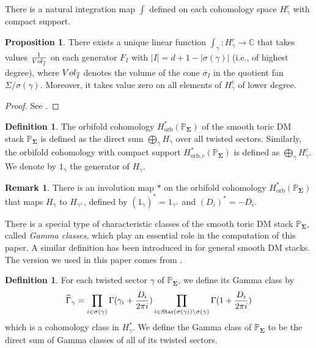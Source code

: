 \documentclass[11pt,reqno]{amsart}
\def\C {{\mathbb C}}
\def\PP {{\mathbb P}}
\def\Vol {{\rm Vol}}
\theoremstyle{definition}
\newtheorem{proposition}[theorem]{Proposition}
\newtheorem{definition}[theorem]{Definition}
\newtheorem{remark}[theorem]{Remark}
\numberwithin{equation}{section}
\begin{document}
\smallskip

There is a natural integration map $\int$ defined on each cohomology space $H_{\gamma}^c$ with compact support.

\smallskip

\begin{proposition}
	There exists a unique linear function $\int_{\gamma}:H_{\gamma}^c\rightarrow\C$ that takes values $\frac{1}{\Vol_{\overline{I}}}$ on each generator $F_I$ with $|I|=d+1-|\sigma(\gamma)|$ (i.e., of highest degree), where $\Vol_{\overline{I}}$ denotes the volume of the cone $\overline{\sigma_{I}}$ in the quotient fan $\Sigma/\sigma(\gamma)$. Moreover, it takes value zero on all elements 
of $H_{\gamma}^c$ of lower degree.
\end{proposition}
\begin{proof}
	See \cite[Proposition 2.6]{BHconj}.
\end{proof}

\smallskip

\begin{definition}
	The orbifold cohomology $H_{\mathrm{orb}}^*(\PP_{\mathbf{\Sigma}})$ of the smooth toric DM stack $\PP_{\mathbf{\Sigma}}$ is defined as the direct sum $\bigoplus_{\gamma} H_{\gamma}$ over all twisted sectors. Similarly, the orbifold cohomology with compact support $H_{\mathrm{orb},c}^*(\PP_{\mathbf{\Sigma}})$ is defined as $\bigoplus_{\gamma} H_{\gamma}^c$. We denote by $1_\gamma$ the generator of $H_\gamma$.
\end{definition}

\smallskip

\begin{remark}
	There is an involution map $*$ on the orbifold cohomology $H_{\mathrm{orb}}^*(\PP_{\mathbf{\Sigma}})$ that maps $H_{\gamma}$ to $H_{\gamma^{\vee}}$, defined by $(1_{\gamma})^*=1_{\gamma^{\vee}}$ and $(D_i)^*=-D_i$.
\end{remark}

\smallskip

There is a special type of characteristic classes of the smooth toric DM stack $\PP_{\mathbf{\Sigma}}$, called \textit{Gamma classes}, which play an essential role in the computation of this paper. A similar definition has been introduced in \cite{I-1} for general smooth DM stacks. The version we used in this paper comes from \cite[Corollary 3.14]{BHanDuality}.

\smallskip

\begin{definition}\label{def-gamma class}
For each twisted sector $\gamma$ of $\PP_{\mathbf{\Sigma}}$, we define its Gamma class by
\begin{align*}
	\widehat{\Gamma}_{\gamma} = \prod_{i\in\sigma(\gamma)}\Gamma(\gamma_i+\frac{D_i}{2\pi {\rm i}})\prod_{i\in\operatorname{Star}(\sigma(\gamma))\backslash\sigma(\gamma)}\Gamma(1+\frac{D_i}{2\pi {\rm i}})
\end{align*}
which is a cohomology class in $H_{\gamma}^*$. We define the Gamma class of $\PP_{\mathbf{\Sigma}}$ to be the direct sum of Gamma classes of all of its twisted sectors.
\end{definition}
\end{document}
